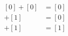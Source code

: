 \documentclass[preview]{standalone}
\begin{document}
\begin{align*}
\begin{aligned}[0] + [0] &= [0] \\[1] + [1] &= [0] \\[0] + [1] &= [1]\end{aligned}
\end{align*}
\end{document}
